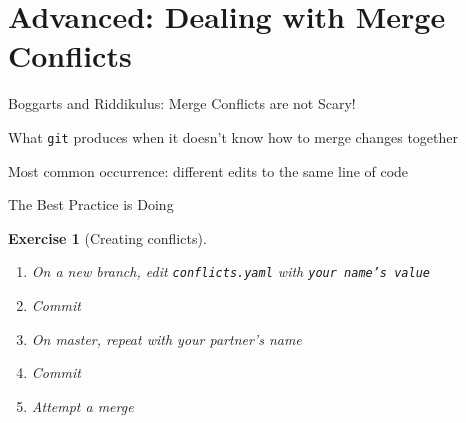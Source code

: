 \documentclass{beamer}
\theoremstyle{example}
\newtheorem{exercise}{Exercise}
\begin{document}
\section{Advanced: Dealing with Merge Conflicts}
\begin{frame}{Boggarts and Riddikulus: Merge Conflicts are \alert{not} Scary!}
    \begin{definition}
        What \texttt{git} produces when it doesn't know how to merge changes
        together
    \end{definition}

    Most common occurrence: different edits to the same line of code
\end{frame}

\begin{frame}{The Best Practice is Doing}
    \begin{exercise}[Creating conflicts]
        \begin{enumerate}
            \item On a new branch, edit \texttt{conflicts.yaml} with
                \texttt{your name's value}
            \item Commit
            \item On master, repeat \emph{with your partner's name}
            \item Commit
            \item Attempt a merge
        \end{enumerate}
    \end{exercise}
\end{frame}
\end{document}
